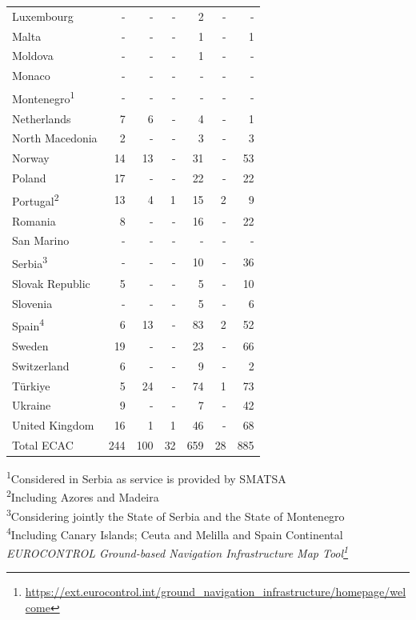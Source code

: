 \documentclass[
  11pt,
  a4paper,
]{book}
\DeclareRobustCommand{\href}[2]{#2\footnote{\url{#1}}}
\begin{document}
\begin{longtable}{lrrrrrr}
Luxembourg & - & - & - & 2 & - & - \\ 
Malta & - & - & - & 1 & - & 1 \\ 
Moldova & - & - & - & 1 & - & - \\ 
Monaco & - & - & - & - & - & - \\ 
Montenegro\textsuperscript{1} & - & - & - & - & - & - \\ 
Netherlands & 7 & 6 & - & 4 & - & 1 \\ 
North Macedonia & 2 & - & - & 3 & - & 3 \\ 
Norway & 14 & 13 & - & 31 & - & 53 \\ 
Poland & 17 & - & - & 22 & - & 22 \\ 
Portugal\textsuperscript{2} & 13 & 4 & 1 & 15 & 2 & 9 \\ 
Romania & 8 & - & - & 16 & - & 22 \\ 
San Marino & - & - & - & - & - & - \\ 
Serbia\textsuperscript{3} & - & - & - & 10 & - & 36 \\ 
Slovak Republic & 5 & - & - & 5 & - & 10 \\ 
Slovenia & - & - & - & 5 & - & 6 \\ 
Spain\textsuperscript{4} & 6 & 13 & - & 83 & 2 & 52 \\ 
Sweden & 19 & - & - & 23 & - & 66 \\ 
Switzerland & 6 & - & - & 9 & - & 2 \\ 
Türkiye & 5 & 24 & - & 74 & 1 & 73 \\ 
Ukraine & 9 & - & - & 7 & - & 42 \\ 
United Kingdom & 16 & 1 & 1 & 46 & - & 68 \\ 
Total ECAC & 244 & 100 & 32 & 659 & 28 & 885 \\ 
\bottomrule
\end{longtable}
\begin{minipage}{\linewidth}
\textsuperscript{1}Considered in Serbia as service is provided by SMATSA\\
\textsuperscript{2}Including Azores and Madeira\\
\textsuperscript{3}Considering jointly the State of Serbia and the State of Montenegro\\
\textsuperscript{4}Including Canary Islands; Ceuta and Melilla and Spain Continental\\
\emph{\href{https://ext.eurocontrol.int/ground_navigation_infrastructure/homepage/welcome}{EUROCONTROL Ground-based Navigation Infrastructure Map Tool}}\\
\end{minipage}
\end{document}
